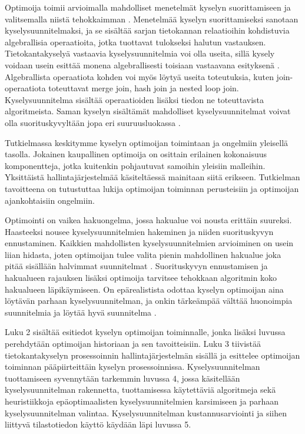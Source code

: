 \documentclass[finnish]{tktltiki2}
\theoremstyle{definition}
\theoremstyle{remark}
\begin{document}
Optimoija toimii arvioimalla mahdolliset menetelmät kyselyn suorittamiseen ja valitsemalla niistä tehokkaimman \cite{selinger1979access}. Menetelmää kyselyn suorittamiseksi sanotaan kyselysuunnitelmaksi, ja se sisältää sarjan tietokannan relaatioihin kohdistuvia algebrallisia operaatioita, jotka tuottavat tulokseksi halutun vastauksen. Tietokantakyselyä vastaavia kyselysuunnitelmia voi olla useita, sillä kysely voidaan usein esittää monena algebrallisesti toisiaan vastaavana esityksenä \cite{jarke1984}. Algebrallista operaatiota kohden voi myös löytyä useita toteutuksia, kuten join-operaatiota toteuttavat merge join, hash join ja nested loop join. Kyselysuunnitelma sisältää operaatioiden lisäksi tiedon ne toteuttavista algoritmeista. Saman kyselyn sisältämät mahdolliset kyselysuunnitelmat voivat olla suorituskyvyltään jopa eri suuruusluokassa \cite{ioannidis1996query, oracle2013refman}. 


Tutkielmassa keskitymme kyselyn optimoijan toimintaan ja ongelmiin yleisellä tasolla. Jokainen kaupallinen optimoija on osittain erilainen kokonaisuus komponentteja, jotka kuitenkin pohjautuvat samoihin yleisiin malleihin. Yksittäistä hallintajärjestelmää käsiteltäessä mainitaan siitä erikseen. Tutkielman tavoitteena on tutustuttaa lukija optimoijan toiminnan perusteisiin ja optimoijan ajankohtaisiin ongelmiin.

Optimointi on vaikea hakuongelma, jossa hakualue voi nousta erittäin suureksi. Haasteeksi nousee kyselysuunnitelmien hakeminen ja niiden suorituskyvyn ennustaminen. Kaikkien mahdollisten kyselysuunnitelmien arvioiminen on usein liian hidasta, joten optimoijan tulee valita pienin mahdollinen hakualue joka pitää sisällään halvimmat suunnitelmat \cite{chaudhuri1998}. Suorituskyvyn ennustamisen ja hakualueen rajauksen lisäksi optimoija tarvitsee tehokkaan algoritmin koko hakualueen läpikäymiseen. On epärealistista odottaa kyselyn optimoijan aina löytävän parhaan kyselysuunnitelman, ja onkin tärkeämpää välttää huonoimpia suunnitelmia ja löytää hyvä suunnitelma \cite{ramakrishnan2003database}. 

Luku 2 sisältää esitiedot kyselyn optimoijan toiminnalle, jonka lisäksi luvussa perehdytään optimoijan historiaan ja sen tavoitteisiin. Luku 3 tiivistää tietokantakyselyn prosessoinnin hallintajärjestelmän sisällä ja esittelee optimoijan toiminnan pääpiirteittäin kyselyn prosessoinnissa. Kyselysuunnitelman tuottamiseen syvennytään tarkemmin luvussa 4, jossa käsitellään kyselysuunnitelman rakennetta, tuottamisessa käytettäviä algoritmeja sekä heuristiikkoja epäoptimaalisten kyselysuunnitelmien karsimiseen ja parhaan kyselysuunnitelman valintaa. Kyselysuunnitelman kustannusarviointi ja siihen liittyvä tilastotiedon käyttö käydään läpi luvussa 5. 
\end{document}
